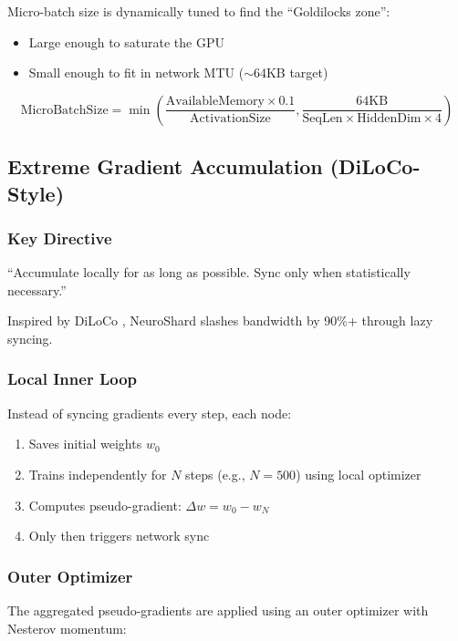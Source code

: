 \documentclass[11pt,a4paper]{article}
\begin{document}
Micro-batch size is dynamically tuned to find the ``Goldilocks zone'':
\begin{itemize}
    \item Large enough to saturate the GPU
    \item Small enough to fit in network MTU ($\sim$64KB target)
\end{itemize}

\begin{equation}
\text{MicroBatchSize} = \min\left( \frac{\text{AvailableMemory} \times 0.1}{\text{ActivationSize}}, \frac{64\text{KB}}{\text{SeqLen} \times \text{HiddenDim} \times 4} \right)
\end{equation}

\subsection{Extreme Gradient Accumulation (DiLoCo-Style)}

\subsubsection{Key Directive}
``Accumulate locally for as long as possible. Sync only when statistically necessary.''

Inspired by DiLoCo \cite{douillard2023diloco}, NeuroShard slashes bandwidth by 90\%+ through lazy syncing.

\subsubsection{Local Inner Loop}

Instead of syncing gradients every step, each node:
\begin{enumerate}
    \item Saves initial weights $w_0$
    \item Trains independently for $N$ steps (e.g., $N=500$) using local optimizer
    \item Computes pseudo-gradient: $\Delta w = w_0 - w_N$
    \item Only then triggers network sync
\end{enumerate}

\subsubsection{Outer Optimizer}

The aggregated pseudo-gradients are applied using an outer optimizer with Nesterov momentum:
\end{document}

